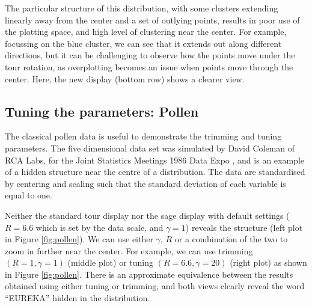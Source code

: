 \documentclass[]{interact}
\theoremstyle{plain}%
\theoremstyle{definition}
\theoremstyle{remark}
\begin{document}
The particular structure of this distribution, with some clusters
extending linearly away from the center and a set of outlying points,
results in poor use of the plotting space, and high level of clustering
near the center. For example, focussing on the blue cluster, we can see
that it extends out along different directions, but it can be
challenging to observe how the points move under the tour rotation, as
overplotting becomes an issue when points move through the center. Here,
the new display (bottom row) shows a clearer view.

\hypertarget{sec:appl4}{%
\subsection{Tuning the parameters: Pollen}\label{sec:appl4}}

The classical pollen data is useful to demonstrate the trimming and
tuning parameters. The five dimensional data set was simulated by David
Coleman of RCA Labs, for the Joint Statistics Meetings 1986 Data Expo
\citep{pollen}, and is an example of a hidden structure near the centre
of a distribution. The data are standardised by centering and scaling
such that the standard deviation of each variable is equal to one.

Neither the standard tour display nor the sage display with default
settings (\(R=6.6\) which is set by the data scale, and \(\gamma=1\))
reveals the structure (left plot in Figure \ref{fig:pollen}). We can use
either \(\gamma\), \(R\) or a combination of the two to zoom in further
near the center. For example, we can use trimming \((R=1, \gamma=1)\)
(middle plot) or tuning \((R=6.6,\gamma=20)\) (right plot) as shown in
Figure \ref{fig:pollen}. There is an approximate equivalence between the
results obtained using either tuning or trimming, and both views clearly
reveal the word ``EUREKA'' hidden in the distribution.
\end{document}
